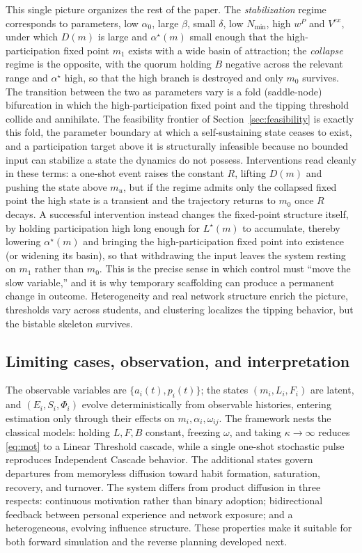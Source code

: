 \documentclass[11pt]{article}
\begin{document}
This single picture organizes the rest of the paper. The \emph{stabilization} regime corresponds to parameters, low $\alpha_0$, large $\beta$, small $\delta$, low $N_{\min}$, high $w^P$ and $V^{ex}$, under which $D(m)$ is large and $\alpha^\star(m)$ small enough that the high-participation fixed point $m_1$ exists with a wide basin of attraction; the \emph{collapse} regime is the opposite, with the quorum holding $B$ negative across the relevant range and $\alpha^\star$ high, so that the high branch is destroyed and only $m_0$ survives. The transition between the two as parameters vary is a fold (saddle-node) bifurcation in which the high-participation fixed point and the tipping threshold collide and annihilate. The feasibility frontier of Section~\ref{sec:feasibility} is exactly this fold, the parameter boundary at which a self-sustaining state ceases to exist, and a participation target above it is structurally infeasible because no bounded input can stabilize a state the dynamics do not possess. Interventions read cleanly in these terms: a one-shot event raises the constant $R$, lifting $D(m)$ and pushing the state above $m_u$, but if the regime admits only the collapsed fixed point the high state is a transient and the trajectory returns to $m_0$ once $R$ decays. A successful intervention instead changes the fixed-point structure itself, by holding participation high long enough for $L^\star(m)$ to accumulate, thereby lowering $\alpha^\star(m)$ and bringing the high-participation fixed point into existence (or widening its basin), so that withdrawing the input leaves the system resting on $m_1$ rather than $m_0$. This is the precise sense in which control must ``move the slow variable,'' and it is why temporary scaffolding can produce a permanent change in outcome. Heterogeneity and real network structure enrich the picture, thresholds vary across students, and clustering localizes the tipping behavior, but the bistable skeleton survives.

\subsection{Limiting cases, observation, and interpretation}\label{sec:nesting}
The observable variables are $\{a_i(t),p_i(t)\}$; the states $(m_i,L_i,F_i)$ are latent, and $(E_i,S_i,\Phi_i)$ evolve deterministically from observable histories, entering estimation only through their effects on $m_i,\alpha_i,\omega_{ij}$. The framework nests the classical models: holding $L,F,B$ constant, freezing $\omega$, and taking $\kappa\to\infty$ reduces \eqref{eq:mot} to a Linear Threshold cascade, while a single one-shot stochastic pulse reproduces Independent Cascade behavior. The additional states govern departures from memoryless diffusion toward habit formation, saturation, recovery, and turnover. The system differs from product diffusion in three respects: continuous motivation rather than binary adoption; bidirectional feedback between personal experience and network exposure; and a heterogeneous, evolving influence structure. These properties make it suitable for both forward simulation and the reverse planning developed next.
\end{document}
